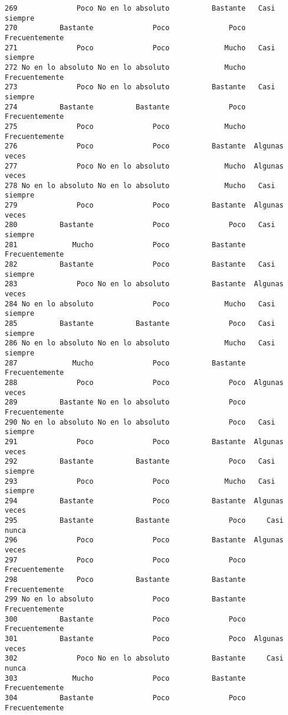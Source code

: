 \documentclass[
  letterpaper,
  DIV=11,
  numbers=noendperiod]{scrartcl}
\begin{document}
\begin{verbatim}
269              Poco No en lo absoluto          Bastante   Casi siempre
270          Bastante              Poco              Poco Frecuentemente
271              Poco              Poco             Mucho   Casi siempre
272 No en lo absoluto No en lo absoluto             Mucho Frecuentemente
273              Poco No en lo absoluto          Bastante   Casi siempre
274          Bastante          Bastante              Poco Frecuentemente
275              Poco              Poco             Mucho Frecuentemente
276              Poco              Poco          Bastante  Algunas veces
277              Poco No en lo absoluto             Mucho  Algunas veces
278 No en lo absoluto No en lo absoluto             Mucho   Casi siempre
279              Poco              Poco          Bastante  Algunas veces
280          Bastante              Poco              Poco   Casi siempre
281             Mucho              Poco          Bastante Frecuentemente
282          Bastante              Poco          Bastante   Casi siempre
283              Poco No en lo absoluto          Bastante  Algunas veces
284 No en lo absoluto              Poco             Mucho   Casi siempre
285          Bastante          Bastante              Poco   Casi siempre
286 No en lo absoluto No en lo absoluto             Mucho   Casi siempre
287             Mucho              Poco          Bastante Frecuentemente
288              Poco              Poco              Poco  Algunas veces
289          Bastante No en lo absoluto              Poco Frecuentemente
290 No en lo absoluto No en lo absoluto              Poco   Casi siempre
291              Poco              Poco          Bastante  Algunas veces
292          Bastante          Bastante              Poco   Casi siempre
293              Poco              Poco             Mucho   Casi siempre
294          Bastante              Poco          Bastante  Algunas veces
295          Bastante          Bastante              Poco     Casi nunca
296              Poco              Poco          Bastante  Algunas veces
297              Poco              Poco              Poco Frecuentemente
298              Poco          Bastante          Bastante Frecuentemente
299 No en lo absoluto              Poco          Bastante Frecuentemente
300          Bastante              Poco              Poco Frecuentemente
301          Bastante              Poco              Poco  Algunas veces
302              Poco No en lo absoluto          Bastante     Casi nunca
303             Mucho              Poco          Bastante Frecuentemente
304          Bastante              Poco              Poco Frecuentemente

\end{verbatim}
\end{document}
